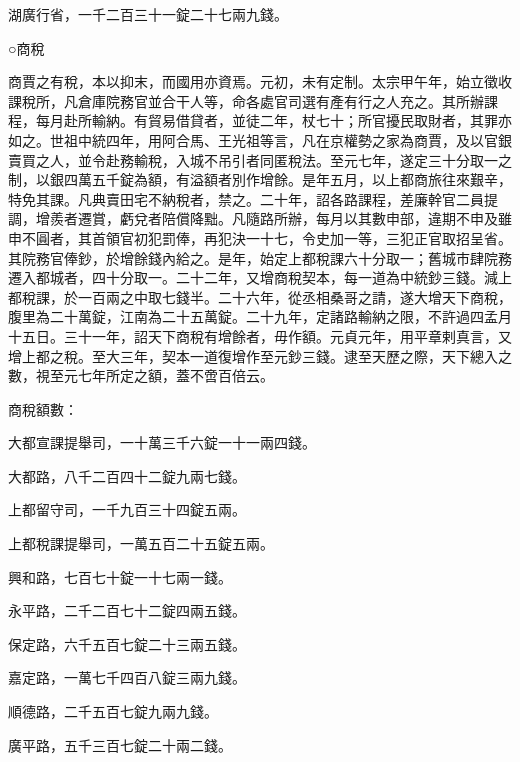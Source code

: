 \begin{pinyinscope}
 湖廣行省，一千二百三十一錠二十七兩九錢。



 ○商稅



 商賈之有稅，本以抑末，而國用亦資焉。元初，未有定制。太宗甲午年，始立徵收課稅所，凡倉庫院務官並合干人等，命各處官司選有產有行之人充之。其所辦課程，每月赴所輸納。有貿易借貸者，並徒二年，杖七十；所官擾民取財者，其罪亦如之。世祖中統四年，用阿合馬、王光祖等言，凡在京權勢之家為商賈，及以官銀賣買之人，並令赴務輸稅，入城不吊引者同匿稅法。至元七年，遂定三十分取一之制，以銀四萬五千錠為額，有溢額者別作增餘。是年五月，以上都商旅往來艱辛，特免其課。凡典賣田宅不納稅者，禁之。二十年，詔各路課程，差廉幹官二員提調，增羨者遷賞，虧兌者陪償降黜。凡隨路所辦，每月以其數申部，違期不申及雖申不圓者，其首領官初犯罰俸，再犯決一十七，令史加一等，三犯正官取招呈省。其院務官俸鈔，於增餘錢內給之。是年，始定上都稅課六十分取一；舊城市肆院務遷入都城者，四十分取一。二十二年，又增商稅契本，每一道為中統鈔三錢。減上都稅課，於一百兩之中取七錢半。二十六年，從丞相桑哥之請，遂大增天下商稅，腹里為二十萬錠，江南為二十五萬錠。二十九年，定諸路輸納之限，不許過四孟月十五日。三十一年，詔天下商稅有增餘者，毋作額。元貞元年，用平章剌真言，又增上都之稅。至大三年，契本一道復增作至元鈔三錢。逮至天歷之際，天下總入之數，視至元七年所定之額，蓋不啻百倍云。



 商稅額數：



 大都宣課提舉司，一十萬三千六錠一十一兩四錢。



 大都路，八千二百四十二錠九兩七錢。



 上都留守司，一千九百三十四錠五兩。



 上都稅課提舉司，一萬五百二十五錠五兩。



 興和路，七百七十錠一十七兩一錢。



 永平路，二千二百七十二錠四兩五錢。



 保定路，六千五百七錠二十三兩五錢。



 嘉定路，一萬七千四百八錠三兩九錢。



 順德路，二千五百七錠九兩九錢。



 廣平路，五千三百七錠二十兩二錢。




\end{pinyinscope}
